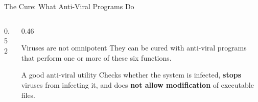 \documentclass[aspectratio=169,11pt,xcolor={table}]{beamer}
\begin{document}
\begin{frame}{The Cure: What Anti-Viral Programs Do}
  \begin{columns}[c]
    \begin{column}{0.52\textwidth}
      \centering
    \end{column}
    \begin{column}{0.46\textwidth}
      \begin{block}{Viruses are not omnipotent}
        \small They can be cured with anti-viral programs that perform one or more of these six functions.
      \end{block}
      \vspace{2mm}
      \begin{exampleblock}{A good anti-viral utility}
        \small Checks whether the system is infected, \textbf{stops} viruses from infecting it, and does \textbf{not allow modification} of executable files.
      \end{exampleblock}
    \end{column}
  \end{columns}
\end{frame}
\end{document}
